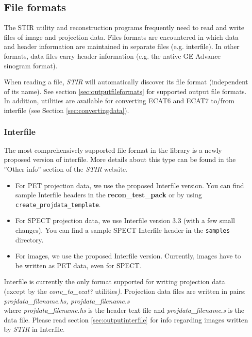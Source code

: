 \documentclass{article}
\begin{document}
\subsection{
File formats}
\label{sec:fileformats}
The STIR utility and reconstruction programs frequently need 
to read and write files of image and projection data. Files formats 
are encountered in which data and header information are maintained 
in separate files (e.g. interfile). In other formats, data files 
carry header information (e.g. the native GE Advance sinogram 
format).

When reading a file, \textit{STIR} will automatically discover its file format
(independent of its name). See section \ref{sec:outputfileformats} for supported output file formats. In addition, 
utilities are available for converting ECAT6 and ECAT7 to/from 
interfile (see Section \ref{sec:convertingdata}). 

\subsubsection{Interfile}

The most comprehensively supported file format in the library 
is a newly proposed version of interfile. More details about 
this type can be found in the ''Other info'' section of the \textit{STIR} website.

\begin{itemize}
\item For PET projection data, we use the proposed Interfile version. You can
find sample Interfile headers in the \textbf{recon\_test\_pack} or by using
\texttt{create\_projdata\_template}.

\item For SPECT projection data, we use Interfile version 3.3 (with a few small changes).
You can find a sample SPECT Interfile header in the \texttt{samples} directory.

\item For images, we use the proposed Interfile version. Currently, images have to 
be written as PET data, even for SPECT.
\end{itemize}

Interfile is currently the only format supported for writing projection 
data (except by the \textit{conv\_to\_ecat?} utilities\textit{)}. Projection 
data files are written in pairs:\\
\textit{projdata\_filename.hs, 
projdata\_filename.s}\\
where \textit{projdata\_filename.hs} is the header text file and \textit{projdata\_filename.s} 
is the data file. Please read section \ref{sec:outputinterfile} for info regarding 
images written by \textit{STIR} in Interfile.
\end{document}
